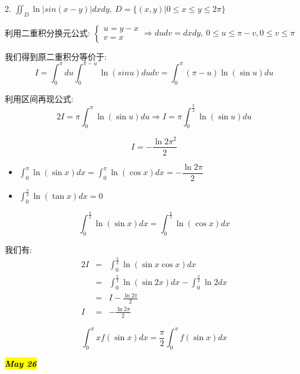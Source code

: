 2. $\iint_{D}\ln|sin(x-y)|dxdy,\ D=\{(x,y)|0\leq x\leq y\leq 2\pi\}$
\begin{solution}
	
	利用二重积分换元公式: $\left\lbrace 
	\begin{array}{l}
		u=y-x\\
		v=x
	\end{array}
	\right.\Rightarrow dudv=dxdy,\ 0\leq u\leq \pi-v,0\leq v\leq \pi$
	
	我们得到原二重积分等价于: 
	$$I=\int_{0}^{\pi}du\int_{0}^{\pi-u}\ln(sin u)dudv=\int_{0}^{\pi}(\pi-u)\ln(\sin u)du$$
	
	利用区间再现公式: 
	$$2I=\pi\int_{0}^{\pi}\ln(\sin u)du\Rightarrow I=\pi\int_{0}^{\frac{\pi}{2}}\ln(\sin u)du$$
	
	$$I=-\frac{\ln 2\pi^2}{2}$$
	\begin{lemma}[区间再现例子]
		\begin{itemize}
			\item $\int_{0}^{\pi}\ln(\sin x)dx=\int_{0}^{\pi}\ln(\cos x)dx=-\dfrac{\ln 2\pi}{2}$
			\item $\int_{0}^{\frac{\pi}{2}}\ln(\tan x)dx=0$
		\end{itemize}
		\begin{anymark}[注]
			$$\int_{0}^{\frac{\pi}{2}}\ln(\sin x)dx=\int_{0}^{\frac{\pi}{2}}\ln(\cos x)dx$$
			
			我们有: 
			\begin{eqnarray*}
				2I&=&\int_{0}^{\frac{\pi}{2}}\ln(\sin x\cos x)dx\\
				&=&\int_{0}^{\frac{\pi}{2}}\ln(\sin 2x)dx-\int_{0}^{\frac{\pi}{2}}\ln 2dx\\
				&=&I-\frac{\ln 2\pi}{2}\\
				I&=&-\frac{\ln 2\pi}{2}
			\end{eqnarray*}
		\end{anymark}
		$$\int_{0}^{\pi}xf(\sin x)dx=\frac{\pi}{2}\int_{0}^{\pi}f(\sin x)dx$$
	\end{lemma}
\end{solution}

\hl{\textbf{\textit{May 26}}}

